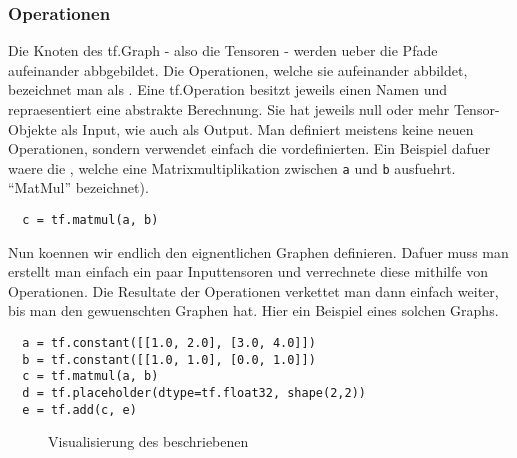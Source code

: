 \subsubsection{Operationen}
Die Knoten des tf.Graph - also die Tensoren - werden ueber die Pfade aufeinander
abbgebildet. Die Operationen, welche sie aufeinander abbildet, bezeichnet man
als . Eine tf.Operation besitzt jeweils einen Namen und repraesentiert eine
abstrakte Berechnung. Sie hat jeweils null oder mehr Tensor-Objekte als
Input, wie auch als Output.
\para{}
Man definiert meistens keine neuen Operationen, sondern verwendet einfach die vordefinierten.
Ein Beispiel dafuer waere die , welche eine
Matrixmultiplikation zwischen \texttt{a} und \texttt{b} ausfuehrt.
``MatMul'' bezeichnet).
\begin{verbatim}
  c = tf.matmul(a, b)
\end{verbatim}
\para{}
Nun koennen wir endlich den eignentlichen Graphen definieren. Dafuer muss man
erstellt man einfach ein paar Inputtensoren und verrechnete diese mithilfe von
Operationen. Die Resultate der Operationen verkettet man dann einfach weiter,
bis man den gewuenschten Graphen hat.
\para{}
Hier ein Beispiel eines solchen Graphs.
\begin{verbatim}
  a = tf.constant([[1.0, 2.0], [3.0, 4.0]])
  b = tf.constant([[1.0, 1.0], [0.0, 1.0]])
  c = tf.matmul(a, b)
  d = tf.placeholder(dtype=tf.float32, shape(2,2))
  e = tf.add(c, e)
\end{verbatim}

\begin{figure}
  \caption{Visualisierung des beschriebenen }
\end{figure}
\para{}


